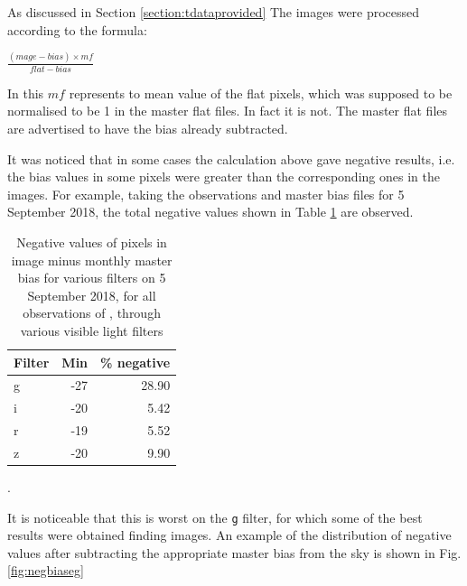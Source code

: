 As discussed in Section \ref{section:tdataprovided} The images were processed according to the formula:

\begin{center}
$ \frac{(mage - bias) \times mf}{flat - bias}$
\end{center}

In this $mf$ represents to mean value of the flat pixels, which was supposed to
be normalised to be 1 in the master flat files. In fact it is not. The master
flat files are advertised to have the bias already subtracted.

It was noticed that in some cases the calculation above gave negative results,
i.e. the bias values in some pixels were greater than the corresponding ones in
the images. For example, taking the observations and master bias files for 5
September 2018, the total negative values shown in Table \ref{table:negmast} are
observed.

\begin{table}[!htbp]
\begin{center}
\begin{tabular}{lrr} \hline
Filter & Min & \% negative \\\hline
g & -27 & 28.90 \\
i & -20 & 5.42 \\
r & -19 & 5.52 \\
z & -20 & 9.90 \\
\hline
\end{tabular}
\end{center}
\caption{Negative values of pixels in image minus monthly master bias for
various filters on 5 September 2018, for all observations of \bstar, through
various visible light filters}.
\protect\label{table:negmast}
\end{table}

It is noticeable that this is worst on the \texttt{g} filter, for which some of
the best results were obtained finding images. An example of the distribution of
negative values after subtracting the appropriate master bias from the sky is
shown in Fig.
\ref{fig:negbiaseg}

